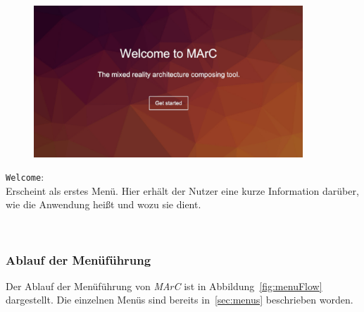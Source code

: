 \begin{minipage}{0.6\textwidth}
	\begin{figure}[H] 
		\includegraphics[trim=3cm 2cm 3cm 2cm, clip, width=0.9\textwidth]{Bilder/Welcome.jpg}
			\label{fig:Welcome}
	\end{figure}
\end{minipage}
\begin{minipage}{0.4\textwidth}
	\texttt{Welcome}:\\
	Erscheint als erstes Menü. Hier erhält der Nutzer eine kurze Information darüber, wie die Anwendung heißt und wozu sie dient.
\end{minipage}\\

\subsubsection{Ablauf der Menüführung}\label{sec:menuAblauf}%
Der Ablauf der Menüführung von \textit{MArC} ist in Abbildung~\ref{fig:menuFlow} dargestellt. Die einzelnen Menüs sind bereits in~\ref{sec:menus} beschrieben worden.

